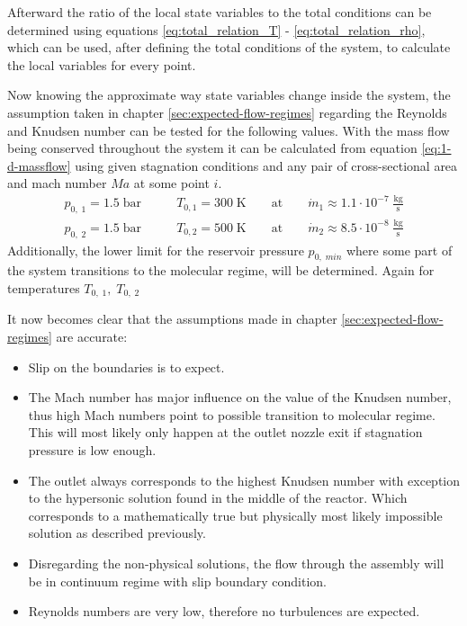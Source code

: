 	Afterward the ratio of the local state variables to the total conditions can be determined using equations \eqref{eq:total_relation_T} - \eqref{eq:total_relation_rho}, which can be used, after defining the total conditions of the system, to calculate the local variables for every point.
	
	Now knowing the approximate way state variables change inside the system, the assumption taken in chapter \ref{sec:expected-flow-regimes} regarding the Reynolds and Knudsen number can be tested for the following values.
	With the mass flow being conserved throughout the system it can be calculated from equation \eqref{eq:1-d-massflow} using given stagnation conditions and any pair of cross-sectional area and mach number $Ma$ at some point $i$.
	\begin{align*}
		p_{0,\;1} = 1.5\;\text{bar}
			&\qquad T_{0,1} = 300\;\text{K}
				\qquad \text{at} \qquad
			\dot{m}_1 \approx 1.1 \cdot 10^{-7} \; \frac{\text{kg}}{\text{s}}\\
		p_{0,\;2} = 1.5\;\text{bar}
			&\qquad T_{0,2} = 500\;\text{K}
				\qquad \text{at} \qquad
			\dot{m}_2 \approx 8.5 \cdot 10^{-8} \; \frac{\text{kg}}{\text{s}}
	\end{align*}
	Additionally, the lower limit for the reservoir pressure $p_{0,\;min}$ where some part of the system transitions to the molecular regime, will be determined.
	Again for temperatures $T_{0,\;1},\;T_{0,\;2}$
	
	\noindent It now becomes clear that the assumptions made in chapter \ref{sec:expected-flow-regimes} are accurate:
	\begin{itemize}
		\item Slip on the boundaries is to expect.
		\item The Mach number has major influence on the value of the Knudsen number, thus high Mach numbers point to possible transition to molecular regime. This will most likely only happen at the outlet nozzle exit if stagnation pressure is low enough.
		\item The outlet always corresponds to the highest Knudsen number with exception to the hypersonic solution found in the middle of the reactor. Which corresponds to a mathematically true but physically most likely impossible solution as described previously.
		\item Disregarding the non-physical solutions, the flow through the assembly will be in continuum regime with slip boundary condition.
		\item Reynolds numbers are very low, therefore no turbulences are expected.
	\end{itemize}
